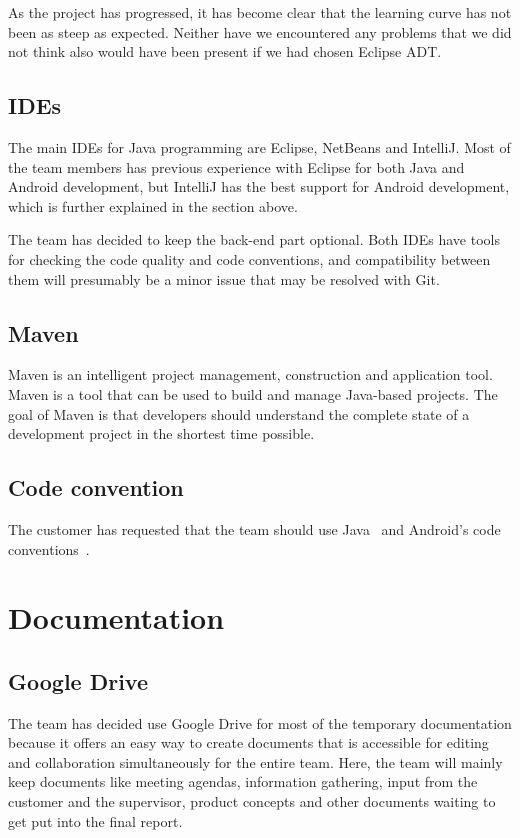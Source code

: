 As the project has progressed, it has become clear that the learning curve has not been as steep as expected. Neither have we encountered any problems that we did not think also would have been present if we had chosen Eclipse ADT.

\subsection{IDEs}
The main IDEs for Java programming are Eclipse, NetBeans and IntelliJ. Most of the team members has previous experience with Eclipse for both Java and Android development, but IntelliJ has the best support for Android development, which is further explained in the section above.

The team has decided to keep the back-end part optional. Both IDEs have tools for checking the code quality and code conventions, and compatibility between them will presumably be a minor issue that may be resolved with Git.

\subsection{Maven}
Maven is an intelligent project management, construction and application tool. Maven is a tool that can be used to build and manage Java-based projects. The goal of Maven is that developers should understand the complete state of a development project in the shortest time possible.

\subsection{Code convention}
The customer has requested that the team should use Java~\cite{javaconv} and Android's code conventions~\cite{androidconv}.

\section{Documentation}

\subsection{Google Drive}
The team has decided use Google Drive for most of the temporary documentation because it offers an easy way to create documents that is accessible for editing and collaboration simultaneously for the entire team. Here, the team will mainly 
keep documents like meeting agendas, information gathering, input from the customer and the supervisor, product concepts and other documents waiting to get put into the final report. 


